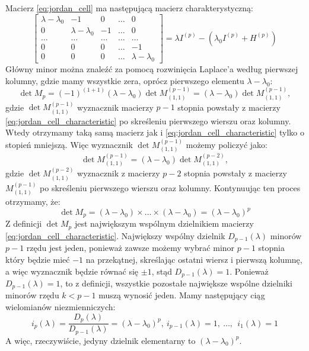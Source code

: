 Macierz \eqref{eq:jordan_cell} ma następującą macierz charakterystyczną:
\begin{equation}\label{eq:jordan_cell_characteristic}
\begin{bmatrix} 
    \lambda - \lambda_{0} & -1 & 0 & \dots & 0 \\
    0 & \lambda - \lambda_{0} & -1 & \dots & 0 \\
    \dots & \dots & \dots & \dots & \dots \\
    0 & 0 & 0 & \dots & -1 \\
    0 & 0 & 0 & \dots & \lambda - \lambda_{0} 
\end{bmatrix} = \lambda I^{(p)} - (\lambda_0I^{(p)} + H^{(p)})
\end{equation}
Główny minor można znaleźć za pomocą rozwinięcia Laplace'a według pierwszej kolumny, gdzie mamy wszystkie zera, oprócz pierwszego elementu $\lambda - \lambda_{0}$:
$$ \det M_p = (-1)^{(1 + 1)}(\lambda - \lambda_0)\det M^{(p - 1)}_{(1,1)}= (\lambda - \lambda_0) \det M^{(p - 1)}_{(1,1)},$$
gdzie $\det M^{(p - 1)}_{(1,1)}$ wyznacznik macierzy $p-1$ stopnia powstały z macierzy \eqref{eq:jordan_cell_characteristic} po skreśleniu pierwszego wierszu oraz kolumny. Wtedy otrzymamy taką samą macierz jak i \eqref{eq:jordan_cell_characteristic} tylko o stopień mniejszą. Więc wyznacznik $\det M^{(p - 1)}_{(1,1)}$ możemy policzyć jako:
$$ \det M^{(p - 1)}_{(1,1)} = (\lambda - \lambda_0)\det M^{(p - 2)}_{(1,1)}, $$
gdzie $\det M^{(p - 2)}_{(1,1)}$ wyznacznik z macierzy $p-2$ stopnia powstały z macierzy $M^{(p - 1)}_{(1,1)}$ po skreśleniu pierwszego wierszu oraz kolumny. Kontynuując ten proces otrzymamy, że:
$$ \det M_p = (\lambda - \lambda_0) \times \ldots \times (\lambda - \lambda_0) = (\lambda - \lambda_0)^p $$
Z definicji $\det M_p$ jest największym wspólnym dzielnikiem macierzy \eqref{eq:jordan_cell_characteristic}. Największy wspólny dzielnik $D_{p-1}(\lambda)$ minorów $p - 1$ rzędu jest jeden, ponieważ zawsze możemy wybrać minor $p-1$ stopnia który będzie mieć $-1$ na przekątnej, skreślając ostatni wiersz i pierwszą kolumnę, a więc wyznacznik będzie równać się $\pm 1$, stąd $D_{p-1}(\lambda) = 1$. Ponieważ $D_{p-1}(\lambda) = 1$, to z definicji, wszystkie pozostałe największe wspólne dzielniki minorów rzędu $k < p - 1$ muszą wynosić jeden. Mamy następujący ciąg wielomianów niezmienniczych:
$$ i_p(\lambda) = \frac{D_{p}(\lambda)}{D_{p - 1}(\lambda)} = (\lambda - \lambda_0)^p, \  i_{p - 1}(\lambda) = 1, \ \ldots, \ \ i_{1}(\lambda) = 1 $$
A więc, rzeczywiście, jedyny dzielnik elementarny to $(\lambda - \lambda_0)^p$.


